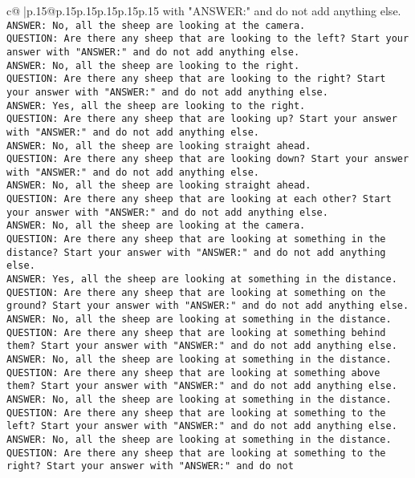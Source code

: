 \documentclass{article}
\begin{document}
{\begin{supertabular}{c@{$\;$}|p{.15\linewidth}@{}p{.15\linewidth}p{.15\linewidth}p{.15\linewidth}p{.15\linewidth}p{.15\linewidth}}
{{{with "ANSWER:" and do not add anything else.\\ \tt ANSWER: No, all the sheep are looking at the camera.\\ \tt QUESTION: Are there any sheep that are looking to the left? Start your answer with "ANSWER:" and do not add anything else.\\ \tt ANSWER: No, all the sheep are looking to the right.\\ \tt QUESTION: Are there any sheep that are looking to the right? Start your answer with "ANSWER:" and do not add anything else.\\ \tt ANSWER: Yes, all the sheep are looking to the right.\\ \tt QUESTION: Are there any sheep that are looking up? Start your answer with "ANSWER:" and do not add anything else.\\ \tt ANSWER: No, all the sheep are looking straight ahead.\\ \tt QUESTION: Are there any sheep that are looking down? Start your answer with "ANSWER:" and do not add anything else.\\ \tt ANSWER: No, all the sheep are looking straight ahead.\\ \tt QUESTION: Are there any sheep that are looking at each other? Start your answer with "ANSWER:" and do not add anything else.\\ \tt ANSWER: No, all the sheep are looking at the camera.\\ \tt QUESTION: Are there any sheep that are looking at something in the distance? Start your answer with "ANSWER:" and do not add anything else.\\ \tt ANSWER: Yes, all the sheep are looking at something in the distance.\\ \tt QUESTION: Are there any sheep that are looking at something on the ground? Start your answer with "ANSWER:" and do not add anything else.\\ \tt ANSWER: No, all the sheep are looking at something in the distance.\\ \tt QUESTION: Are there any sheep that are looking at something behind them? Start your answer with "ANSWER:" and do not add anything else.\\ \tt ANSWER: No, all the sheep are looking at something in the distance.\\ \tt QUESTION: Are there any sheep that are looking at something above them? Start your answer with "ANSWER:" and do not add anything else.\\ \tt ANSWER: No, all the sheep are looking at something in the distance.\\ \tt QUESTION: Are there any sheep that are looking at something to the left? Start your answer with "ANSWER:" and do not add anything else.\\ \tt ANSWER: No, all the sheep are looking at something in the distance.\\ \tt QUESTION: Are there any sheep that are looking at something to the right? Start your answer with "ANSWER:" and do not }}}
\end{supertabular}}
\end{document}
